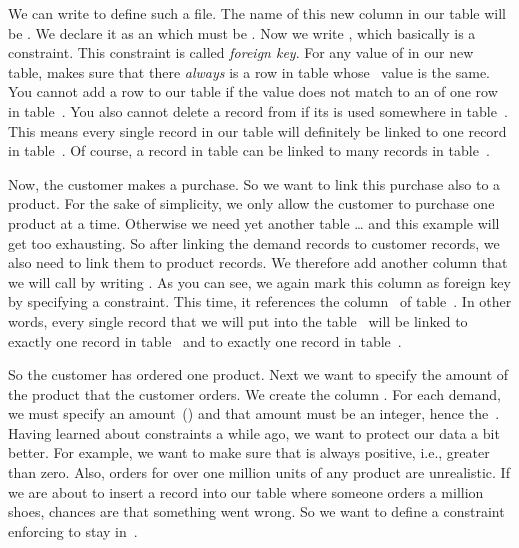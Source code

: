 We can write  to define such a file.
The name of this new column in our table  will be .
We declare it as an  which must be .
Now we write , which basically is a constraint.
This constraint is called \emph{foreign key}.
For any value of  in our new table, makes sure that there \emph{always} is a row in table  whose ~value is the same.
You cannot add a row to our table  if the  value does not match to an  of one row in table~.
You also cannot delete a record from  if its  is used somewhere in table~.
This means every single record in our table  will definitely be linked to one record in table~.
Of course, a record in table  can be linked to many records in table~.

Now, the customer makes a purchase.
So we want to link this purchase also to a product.
For the sake of simplicity, we only allow the customer to purchase one product at a time.
Otherwise we need yet another table {\dots} and this example will get too exhausting.
So after linking the demand records to customer records, we also need to link them to product records.
We therefore add another column that we will call  by writing .
As you can see, we again mark this column as foreign key by specifying a  constraint.
This time, it references the column~ of table~.
In other words, every single record that we will put into the table~ will be linked to exactly one record in table~ and to exactly one record in table~.

So the customer has ordered one product.
Next we want to specify the amount of the product that the customer orders.
We create the column .
For each demand, we must specify an amount~() and that amount must be an integer, hence the~.
Having learned about constraints a while ago, we want to protect our data a bit better.
For example, we want to make sure that  is always positive, i.e., greater than zero.
Also, orders for over one million units of any product are unrealistic.
If we are about to insert a record into our  table where someone orders a million shoes, chances are that something went wrong.
So we want to define a constraint enforcing  to stay in~.

